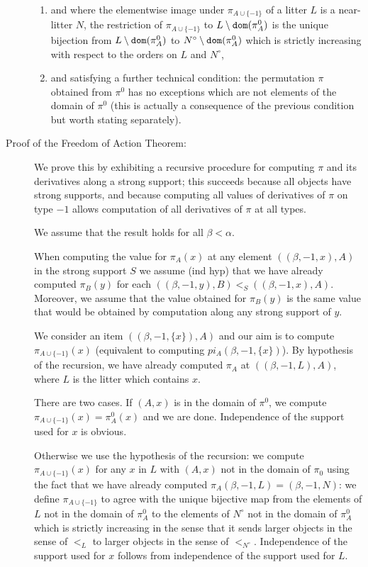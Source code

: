 \documentclass[112pt]{article}
\begin{document}
\begin{description}
\begin{enumerate}
\item and where the elementwise image under $\pi_{A\cup \{-1\}}$ of a litter $L$ is a near-litter $N$, the restriction of $\pi_{A\cup \{-1\}}$  to $L \setminus {\tt dom}(\pi^0_A)$ is the unique bijection from $L \setminus {\tt dom}(\pi^0_A)$  to $N^\circ \setminus {\tt dom}(\pi^0_A)$ which is strictly increasing with respect to the orders on $L$ and $N^\circ$,

\item and satisfying a further technical condition:    the permutation $\pi$ obtained from $\pi^0$ has no exceptions which are not elements of the domain of $\pi^0$ (this is actually a consequence of the previous condition but worth stating separately).

\end{enumerate}

\item[Proof of the Freedom of Action Theorem:]  We prove this by exhibiting a recursive procedure for computing $\pi$ and its derivatives along a strong support;  this succeeds because all objects have
strong supports, and because computing all values of derivatives of $\pi$ on type $-1$ allows computation of all derivatives of $\pi$ at all types.

We assume that the result holds for all $\beta<\alpha$.

When computing the value for $\pi_A(x)$ at any element $((\beta,-1,x),A)$ in the strong support $S$ we assume (ind hyp) that we have already computed
$\pi_B(y)$ for each $((\beta,-1,y),B) <_S ((\beta,-1,x),A)$.  Moreover, we assume that the value obtained for $\pi_B(y)$ is the same value that would be obtained by computation along any strong support of $y$.

We consider an item $((\beta,-1,\{x\}),A)$ and our aim is to compute $\pi_{A \cup \{-1\}}(x)$ (equivalent to computing $pi_A(\beta,-1,\{x\})$).  By hypothesis of the recursion, we have already
computed $\pi_A$ at $((\beta,-1,L),A)$, where $L$ is the litter which contains $x$.

There are two cases.  If $(A,x)$ is in the domain of $\pi^0$, we compute $\pi_{A \cup \{-1\}}(x) = \pi^0_A(x)$ and we are done.  Independence of the support used for $x$ is obvious.

Otherwise we use the hypothesis of the recursion:  we compute $\pi_{A \cup \{-1\}}(x)$ for any $x$ in $L$ with $(A,x)$ not in the domain of $\pi_0$ using the fact that we have already computed $\pi_A(\beta,-1,L) = (\beta,-1,N)$:  we define $\pi_{A \cup \{-1\}}$ to agree with the unique bijective map from the
elements of $L$ not in the domain of $\pi^0_A$ to the elements of $N^{\circ}$ not in the domain of $\pi^0_A$ which is strictly increasing in the sense that it sends larger objects in the sense of $<_L$ to larger objects in the sense of $<_{N^{\circ}}$.  Independence of the support used for $x$ follows from independence of the support used for $L$.


\end{description}
\end{document}

